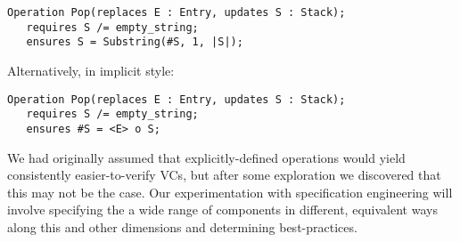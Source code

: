 \begin{lstlisting}
Operation Pop(replaces E : Entry, updates S : Stack);
   requires S /= empty_string;
   ensures S = Substring(#S, 1, |S|);
\end{lstlisting}

Alternatively, in implicit style:

\begin{lstlisting}
Operation Pop(replaces E : Entry, updates S : Stack);
   requires S /= empty_string;
   ensures #S = <E> o S;
\end{lstlisting}

We had originally assumed that explicitly-defined operations would yield consistently easier-to-verify VCs, but after some exploration we discovered that this may not be the case.  Our experimentation with specification engineering will involve specifying the a wide range of components in different, equivalent ways along this and other dimensions and determining best-practices.
